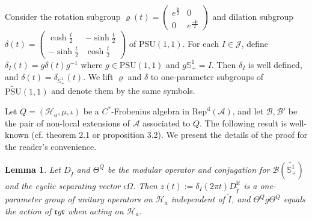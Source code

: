 \documentclass[12pt,a4paper]{article}
\theoremstyle{definition}
\theoremstyle{plain}
\newtheorem{lm}[df]{Lemma}
\newcommand{\fk}{\mathfrak}
\newcommand{\mc}{\mathcal}
\newcommand{\wtd}{\widetilde}
\newcommand{\PSU}{\mathrm{PSU}(1,1)}
\newcommand{\UPSU}{\widetilde{\mathrm{PSU}}(1,1)}
\newcommand{\im}{\mathbf{i}}
\newcommand{\RepdA}{\mathrm{Rep}^{\mathrm d}(\mc A)}
\newcommand{\mbb}{\mathbb}
\numberwithin{equation}{section}
\begin{document}
Consider the rotation subgroup $
\varrho(t)=\left( \begin{array}{cc}
e^{\frac {\im t}2} & 0 \\
0 &e^{\frac {-\im t}2}
\end{array} \right)$ and dilation subgroup 
$\delta(t)=\left( \begin{array}{cc}
\cosh\frac t2 & -\sinh\frac t2 \\
-\sinh\frac t2 &\cosh\frac t2
\end{array} \right)$ of $\PSU$. For each $I\in\mc J$, define $\delta_I(t)=g\delta(t)g^{-1}$ where $g\in\PSU$ and $g\mbb S^1_+=I$. Then $\delta_I$ is well defined, and $\delta(t)=\delta_{\mbb S^1_+}(t)$. We lift $\varrho$ and $\delta$ to one-parameter subgroups of $\UPSU$ and denote them by the same symbols.
 


Let $Q=(\mc H_a,\mu,\iota)$ be a $C^*$-Frobenius algebra in $\RepdA$, and let $\mc B,\mc B'$ be the pair of non-local extensions of $\mc A$ associated to $Q$. The following result is well-known (cf. \cite{ALR01} theorem 2.1 or \cite{LR04} proposition 3.2). We present the details of the proof for the reader's convenience.

\begin{lm}\label{lb35}
Let $D_{\wtd I}$ and $\Theta^Q$ be the modular operator and conjugation for $\mc B(\wtd{\mbb S_+^1})$ and the cyclic separating vector $\iota\Omega$. Then $z(t):=\delta_I(2\pi t)D_{\wtd I}^{\im t}$ is a one-parameter group of unitary operators on $\mc H_a$ independent of $\wtd I$, and $\Theta^Qg\Theta^Q$ equals the action of $\fk r g\fk r$ when acting on $\mc H_a$. 
\end{lm}
\end{document}
